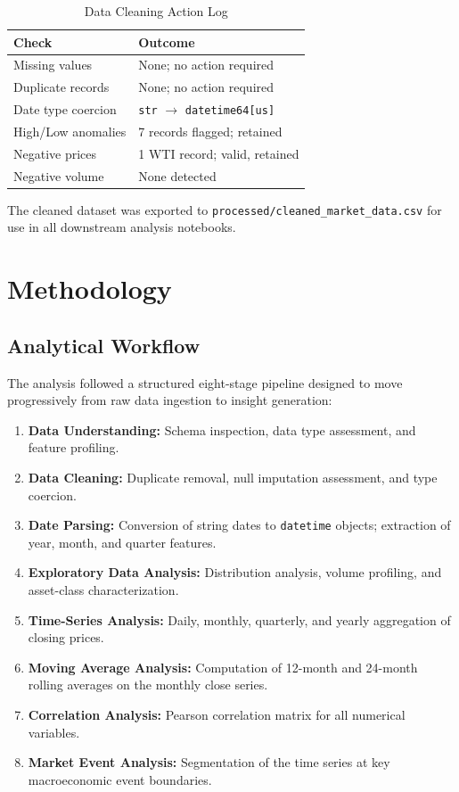 \documentclass[10pt,a4paper,twocolumn]{article}
\begin{document}
\begin{table}[H]
\centering
\caption{Data Cleaning Action Log}
\label{tab:cleaning_summary}
\small
\begin{tabular}{@{}p{3cm}p{4cm}@{}}
\toprule
\textbf{Check} & \textbf{Outcome} \\
\midrule
Missing values      & None; no action required \\
Duplicate records   & None; no action required \\
Date type coercion  & \texttt{str} $\rightarrow$ \texttt{datetime64[us]} \\
High/Low anomalies  & 7 records flagged; retained \\
Negative prices     & 1 WTI record; valid, retained \\
Negative volume     & None detected \\
\bottomrule
\end{tabular}
\end{table}

The cleaned dataset was exported to \texttt{processed/cleaned\_market\_data.csv} for use in all downstream analysis notebooks.

\section{Methodology}

\subsection{Analytical Workflow}

The analysis followed a structured eight-stage pipeline designed to move progressively from raw data ingestion to insight generation:

\begin{enumerate}[leftmargin=1.4em, itemsep=1pt, topsep=2pt]
  \item \textbf{Data Understanding:} Schema inspection, data type assessment, and feature profiling.
  \item \textbf{Data Cleaning:} Duplicate removal, null imputation assessment, and type coercion.
  \item \textbf{Date Parsing:} Conversion of string dates to \texttt{datetime} objects; extraction of year, month, and quarter features.
  \item \textbf{Exploratory Data Analysis:} Distribution analysis, volume profiling, and asset-class characterization.
  \item \textbf{Time-Series Analysis:} Daily, monthly, quarterly, and yearly aggregation of closing prices.
  \item \textbf{Moving Average Analysis:} Computation of 12-month and 24-month rolling averages on the monthly close series.
  \item \textbf{Correlation Analysis:} Pearson correlation matrix for all numerical variables.
  \item \textbf{Market Event Analysis:} Segmentation of the time series at key macroeconomic event boundaries.
\end{enumerate}
\end{document}
